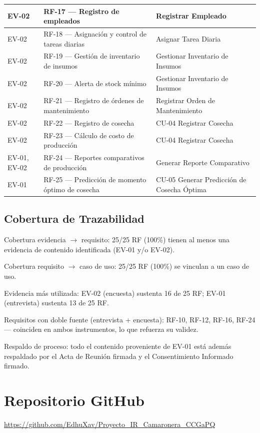 \documentclass[11pt,a4paper]{article}
\begin{document}
\begin{longtable}{|p{2.5cm}|p{6.5cm}|p{5.5cm}|}
\hline
EV-02 & RF-17 — Registro de empleados & Registrar Empleado \\
\hline
EV-02 & RF-18 — Asignación y control de tareas diarias & Asignar Tarea Diaria \\
\hline
EV-02 & RF-19 — Gestión de inventario de insumos & Gestionar Inventario de Insumos \\
\hline
EV-02 & RF-20 — Alerta de stock mínimo & Gestionar Inventario de Insumos \\
\hline
EV-02 & RF-21 — Registro de órdenes de mantenimiento & Registrar Orden de Mantenimiento \\
\hline
EV-02 & RF-22 — Registro de cosecha & CU-04 Registrar Cosecha \\
\hline
EV-02 & RF-23 — Cálculo de costo de producción & CU-04 Registrar Cosecha \\
\hline
EV-01, EV-02 & RF-24 — Reportes comparativos de producción & Generar Reporte Comparativo \\
\hline
EV-01 & RF-25 — Predicción de momento óptimo de cosecha & CU-05 Generar Predicción de Cosecha Óptima \\
\hline
\end{longtable}

\subsection{Cobertura de Trazabilidad}
Cobertura evidencia $\rightarrow$ requisito: 25/25 RF (100\%) tienen al menos una evidencia de contenido identificada (EV-01 y/o EV-02).

Cobertura requisito $\rightarrow$ caso de uso: 25/25 RF (100\%) se vinculan a un caso de uso.

Evidencia más utilizada: EV-02 (encuesta) sustenta 16 de 25 RF; EV-01 (entrevista) sustenta 13 de 25 RF.

Requisitos con doble fuente (entrevista + encuesta): RF-10, RF-12, RF-16, RF-24 — coinciden en ambos instrumentos, lo que refuerza su validez.

Respaldo de proceso: todo el contenido proveniente de EV-01 está además respaldado por el Acta de Reunión firmada y el Consentimiento Informado firmado.
\section{Repositorio GitHub}
\url{https://github.com/EdhuXav/Proyecto_IR_Camaronera_CCGaPQ}
\end{document}
